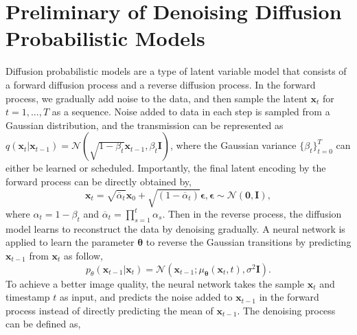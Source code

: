 \section{Preliminary of Denoising Diffusion Probabilistic Models }
\label{sec:ddpm}

Diffusion probabilistic models \cite{ho2020denoising,song2020denoising,song2020score} are a type of latent variable model that consists of a forward diffusion process and a reverse diffusion process. In the forward process, we gradually add noise to the data, and then sample the latent $\mathbf{x}_t$ for $t=1,..., T$ as a sequence. Noise added to data in each step is sampled from a Gaussian distribution, and the transmission can be represented as $q(\mathbf{x}_t|\mathbf{x}_{t-1})=\mathcal{N} (\sqrt{1-\beta_{t}}\mathbf{x}_{t-1}, \beta_{t}\boldsymbol{I})$, where the Gaussian variance $\{\beta_{t}\}_{t=0}^{T}$ can either be learned or scheduled. Importantly, the final latent encoding by the forward process can be directly obtained by,
\begin{equation}
\label{eq1}
\mathbf{x}_t = \sqrt{\overline{\alpha}_t}\mathbf{x}_0 + \sqrt{(1 - \overline{\alpha}_t)}\boldsymbol{\epsilon},  
     \boldsymbol{\epsilon} \sim \mathcal{N}(\mathbf{0},\boldsymbol{I}), 
\end{equation}
where $\alpha_t=1 - \beta_t$ and $\overline{\alpha}_t=\prod_{s=1}^t \alpha_s$.
Then in the reverse process, the diffusion model learns to reconstruct the data by denoising gradually. A neural network is applied to learn the parameter $\boldsymbol{\theta}$ to reverse the Gaussian transitions by predicting $\mathbf{x}_{t-1}$ from $\mathbf{x}_{t}$ as follow,
\begin{equation}
\label{eq2}
p_\theta(\mathbf{x}_{t-1}|\mathbf{x}_t)=\mathcal{N}(\mathbf{x}_{t-1};{\mu}_{\boldsymbol{\theta}}(\mathbf{x}_t,t),\sigma^2\boldsymbol{I}).
\end{equation}
To achieve a better image quality, the neural network takes the sample $\mathbf{x}_t$ and timestamp $t$ as input, and predicts the noise added to $\mathbf{x}_{t-1}$ in the forward process instead of directly predicting the mean of $\mathbf{x}_{t-1}$. 
The denoising process can be defined as,
